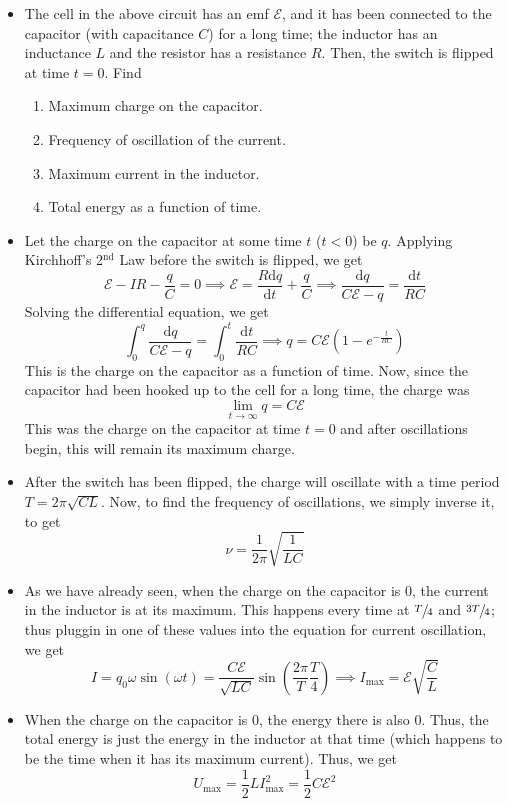 \documentclass{scrartcl}
\begin{document}
    \begin{itemize}
        \item The cell in the above circuit has an emf $\mathcal E$, and it has been connected to the capacitor (with capacitance $C$) for a long time; the inductor has an inductance $L$ and the resistor has a resistance $R$. Then, the switch is flipped at time $t=0$. Find
        \begin{enumerate}[label=(\alph*)]
            \item Maximum charge on the capacitor.
            \item Frequency of oscillation of the current.
            \item Maximum current in the inductor.
            \item Total energy as a function of time.
        \end{enumerate}
        \item Let the charge on the capacitor at some time $t$ ($t<0$) be $q$. Applying Kirchhoff's 2$^\text{nd}$ Law before the switch is flipped, we get \[\mathcal E-IR-\frac qC=0\implies\mathcal E=\frac{R\mathrm dq}{\mathrm dt}+\frac qC\implies\frac{\mathrm dq}{C\mathcal E-q}=\frac{\mathrm dt}{RC}\] Solving the differential equation, we get \[\int_0^q\frac{\mathrm dq}{C\mathcal E-q}=\int_0^t\frac{\mathrm dt}{RC}\implies\boxed{q=C\mathcal E\left(1-e^{-\frac t{RC}}\right)}\] This is the charge on the capacitor as a function of time. Now, since the capacitor had been hooked up to the cell for a long time, the charge was \[\lim_{t\to\infty}q=C\mathcal E\] This was the charge on the capacitor at time $t=0$ and after oscillations begin, this will remain its maximum charge.
        \item After the switch has been flipped, the charge will oscillate with a time period $T=2\pi\sqrt{CL}$. Now, to find the frequency of oscillations, we simply inverse it, to get \[\nu=\frac1{2\pi}\sqrt{\frac1{LC}}\]
        \item As we have already seen, when the charge on the capacitor is 0, the current in the inductor is at its maximum. This happens every time at $\sfrac T4$ and $\sfrac {3T}4$; thus pluggin in one of these values into the equation for current oscillation, we get \[I=q_0\omega\sin\left(\omega t\right)=\frac{C\mathcal E}{\sqrt{LC}}\sin\left(\frac{2\pi}T\frac T4\right)\implies\boxed{I_\text{max}=\mathcal E\sqrt{\frac CL}}\]
        \item When the charge on the capacitor is 0, the energy there is also 0. Thus, the total energy is just the energy in the inductor at that time (which happens to be the time when it has its maximum current). Thus, we get \[U_\text{max}=\frac12LI_\text{max}^2=\frac12C\mathcal E^2\]
    \end{itemize}
\end{document}
